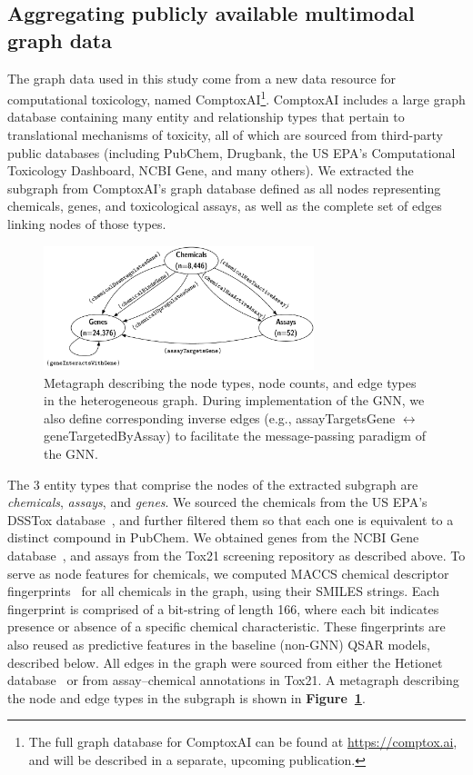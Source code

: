 \documentclass{ws-procs11x85}
\begin{document}
\subsection{Aggregating publicly available multimodal graph data}
The graph data used in this study come from a new data resource for computational toxicology, named ComptoxAI\footnote{The full graph database for ComptoxAI can be found at \url{https://comptox.ai}, and will be described in a separate, upcoming publication.}.
ComptoxAI includes a large graph database containing many entity and relationship types that pertain to translational mechanisms of toxicity, all of which are sourced from third-party public databases (including PubChem, Drugbank, the US EPA's Computational Toxicology Dashboard, NCBI Gene, and many others).
We extracted the subgraph from ComptoxAI's graph database defined as all nodes representing chemicals, genes, and toxicological assays, as well as the complete set of edges linking nodes of those types.

\begin{figure}
   \centering
   \includegraphics[width=0.7\textwidth]{figures/figure1-1.pdf}
   \caption{Metagraph describing the node types, node counts, and edge types in the heterogeneous graph. During implementation of the GNN, we also define corresponding inverse edges (e.g., assayTargetsGene $\leftrightarrow$ geneTargetedByAssay) to facilitate the message-passing paradigm of the GNN.}\label{fig:2}
\end{figure}

The 3 entity types that comprise the nodes of the extracted subgraph are \textit{chemicals}, \textit{assays}, and \textit{genes}.
We sourced the chemicals from the US EPA's DSSTox database~\cite{williams2017comptox}, and further filtered them so that each one is equivalent to a distinct compound in PubChem.
We obtained genes from the NCBI Gene database~\cite{brown2015gene}, and assays from the Tox21 screening repository as described above.
To serve as node features for chemicals, we computed MACCS chemical descriptor fingerprints~\cite{durant2002reoptimization} for all chemicals in the graph, using their SMILES strings.
Each fingerprint is comprised of a bit-string of length 166, where each bit indicates presence or absence of a specific chemical characteristic.
These fingerprints are also reused as predictive features in the baseline (non-GNN) QSAR models, described below.
All edges in the graph were sourced from either the Hetionet database~\cite{himmelstein2017systematic} or from assay--chemical annotations in Tox21.
A metagraph describing the node and edge types in the subgraph is shown in \textbf{Figure~\ref{fig:2}}.
\end{document}
